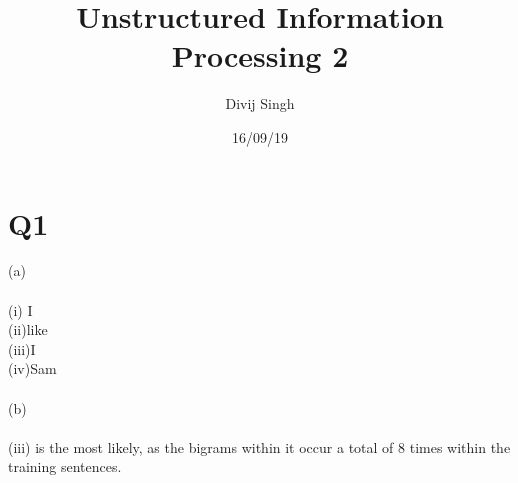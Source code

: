 \documentclass{article}
\title{Unstructured Information Processing 2}
\author{Divij Singh}
\date{16/09/19}
\begin{document}
	\maketitle
	
	\section{Q1}
(a)\\\\
(i) I\\
(ii)like\\
(iii)I\\
(iv)Sam\\\\
(b)\\\\
(iii) is the most likely, as the bigrams within it occur a total of 8 times within the training sentences.
\end{document}
